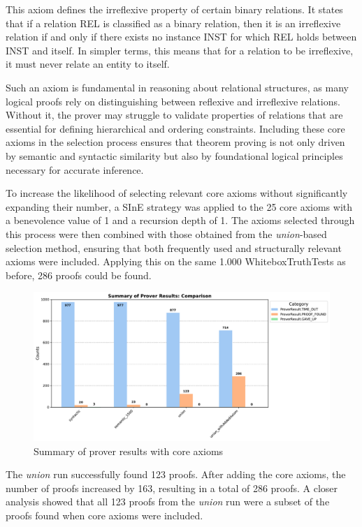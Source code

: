 \documentclass[english,version-2020-11]{uzl-thesis}
\begin{document}
This axiom defines the irreflexive property of certain binary relations. It states that if a relation REL is classified as a binary relation, then it is an irreflexive relation if and only if there exists no instance INST for which REL holds between INST and itself. In simpler terms, this means that for a relation to be irreflexive, it must never relate an entity to itself.

Such an axiom is fundamental in reasoning about relational structures, as many logical proofs rely on distinguishing between reflexive and irreflexive relations. Without it, the prover may struggle to validate properties of relations that are essential for defining hierarchical and ordering constraints. Including these core axioms in the selection process ensures that theorem proving is not only driven by semantic and syntactic similarity but also by foundational logical principles necessary for accurate inference.

To increase the likelihood of selecting relevant core axioms without significantly expanding their number, a SInE strategy was applied to the 25 core axioms with a benevolence value of 1 and a recursion depth of 1. The axioms selected through this process were then combined with those obtained from the \textit{union}-based selection method, ensuring that both frequently used and structurally relevant axioms were included. Applying this on the same 1.000 WhiteboxTruthTests as before, 286 proofs could be found.

\begin{figure}[h!]
    \centering
    \includegraphics[width=\textwidth]{standard_mode_output.pdf}
    \caption{Summary of prover results with core axioms}
    \label{fig:prover_results_with_core_axioms}
\end{figure}
\FloatBarrier

The \textit{union} run successfully found 123 proofs. After adding the core axioms, the number of proofs increased by 163, resulting in a total of 286 proofs. A closer analysis showed that all 123 proofs from the \textit{union} run were a subset of the proofs found when core axioms were included. 
\end{document}
